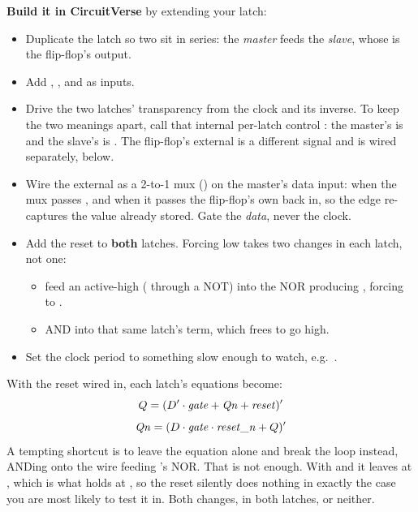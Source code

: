 \textbf{Build it in CircuitVerse} by extending your  latch:
\begin{itemize}
  \item Duplicate the latch so two sit in series: the \emph{master} feeds the \emph{slave}, whose
     is the flip-flop's output.
  \item Add , ,  and  as inputs.
  \item Drive the two latches' transparency from the clock and its inverse. To keep the two meanings
    apart, call that internal per-latch control : the master's  is
     and the slave's is . The flip-flop's external  is a
    different signal and is wired separately, below.
  \item Wire the external  as a 2-to-1 mux () on the master's data input:
    when  the mux passes , and when  it passes the
    flip-flop's own  back in, so the edge re-captures the value already stored. Gate the
    \emph{data}, never the clock.
  \item Add the reset to \textbf{both} latches. Forcing  low takes two changes in each
    latch, not one:
    \begin{itemize}
      \item feed an active-high  ( through a NOT) into the NOR producing
        , forcing  to .
      \item AND  into that same latch's  term, which frees 
        to go high.
    \end{itemize}
  \item Set the clock period to something slow enough to watch, e.g.\ .
\end{itemize}
With the reset wired in, each latch's equations become:
\[ Q = (D' \cdot \mathit{gate} + \mathit{Qn} + \mathit{reset})' \]
\[ \mathit{Qn} = (D \cdot \mathit{gate} \cdot \mathit{reset\_n} + Q)' \]
A tempting shortcut is to leave the  equation alone and break the loop instead, ANDing
 onto the  wire feeding 's NOR. That is not enough. With
 and  it leaves  at , which is what holds  at
, so the reset silently does nothing in exactly the case you are most likely to test it in.
Both changes, in both latches, or neither.

